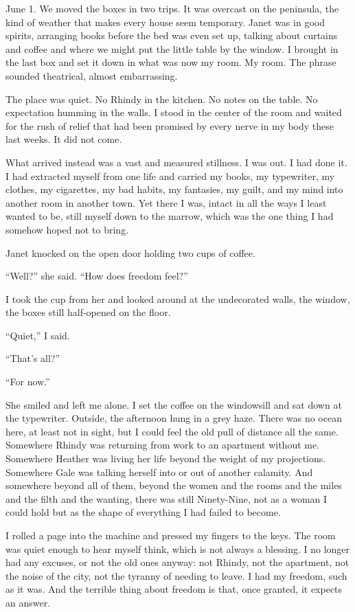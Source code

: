 June 1. We moved the boxes in two trips. It was overcast on the
peninsula, the kind of weather that makes every house seem temporary.
Janet was in good spirits, arranging books before the bed was even set
up, talking about curtains and coffee and where we might put the little
table by the window. I brought in the last box and set it down in what
was now my room. My room. The phrase sounded theatrical, almost
embarrassing.

The place was quiet. No Rhindy in the kitchen. No notes on the table. No
expectation humming in the walls. I stood in the center of the room and
waited for the rush of relief that had been promised by every nerve in
my body these last weeks. It did not come.

What arrived instead was a vast and measured stillness. I was out. I had
done it. I had extracted myself from one life and carried my books, my
typewriter, my clothes, my cigarettes, my bad habits, my fantasies, my
guilt, and my mind into another room in another town. Yet there I was,
intact in all the ways I least wanted to be, still myself down to the
marrow, which was the one thing I had somehow hoped not to bring.

Janet knocked on the open door holding two cups of coffee.

``Well?'' she said. ``How does freedom feel?''

I took the cup from her and looked around at the undecorated walls, the
window, the boxes still half-opened on the floor.

``Quiet,'' I said.

``That's all?''

``For now.''

She smiled and left me alone. I set the coffee on the windowsill and sat
down at the typewriter. Outside, the afternoon hung in a grey haze.
There was no ocean here, at least not in sight, but I could feel the old
pull of distance all the same. Somewhere Rhindy was returning from work
to an apartment without me. Somewhere Heather was living her life beyond
the weight of my projections. Somewhere Gale was talking herself into or
out of another calamity. And somewhere beyond all of them, beyond the
women and the rooms and the miles and the filth and the wanting, there
was still Ninety-Nine, not as a woman I could hold but as the shape of
everything I had failed to become.

I rolled a page into the machine and pressed my fingers to the keys. The
room was quiet enough to hear myself think, which is not always a
blessing. I no longer had any excuses, or not the old ones anyway: not
Rhindy, not the apartment, not the noise of the city, not the tyranny of
needing to leave. I had my freedom, such as it was. And the terrible
thing about freedom is that, once granted, it expects an answer.

